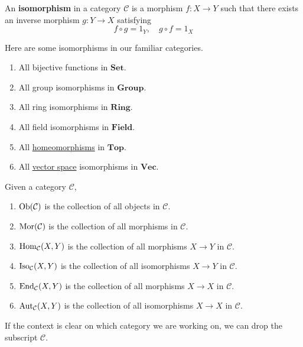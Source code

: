 	\begin{definition}[Isomorphism]
	  \label{def:isomorphism}
		An \textbf{isomorphism} in a category $\mathcal{C}$ is a morphism $f: X \to Y$ such that there exists an inverse morphism $g: Y \to X$ satisfying 
		\begin{equation}
		  f \circ g = 1_Y, \quad g \circ f = 1_X
		\end{equation}
	\end{definition}

	\begin{example}[Isomorphisms]
	  \label{ex:isomorphisms}
		Here are some isomorphisms in our familiar categories. 
	  \begin{enumerate}
			\item All bijective functions in $\mathbf{Set}$. 
			\item All group isomorphisms in $\mathbf{Group}$. 
			\item All ring isomorphisms in $\mathbf{Ring}$. 
			\item All field isomorphisms in $\mathbf{Field}$. 
			\item All \hyperref[pst-def:homeomorphism]{homeomorphisms} in $\mathbf{Top}$. 
			\item All \hyperref[lin-def:vector-space]{vector space} isomorphisms in $\mathbf{Vec}$. 
	  \end{enumerate}
	\end{example}

	\begin{definition}[Notation]
	  \label{def:notation}
		Given a category $\mathcal{C}$, 
		\begin{enumerate}
			\item $\operatorname{Ob}(\mathcal{C})$ is the collection of all objects in $\mathcal{C}$. 
			\item $\operatorname{Mor}(\mathcal{C})$ is the collection of all morphisms in $\mathcal{C}$. 
			\item $\operatorname{Hom}_{\mathcal{C}}(X, Y)$ is the collection of all morphisms $X \to Y$ in $\mathcal{C}$. 
			\item $\operatorname{Iso}_{\mathcal{C}}(X, Y)$ is the collection of all isomorphisms $X \to Y$ in $\mathcal{C}$. 
			\item $\operatorname{End}_{\mathcal{C}}(X, Y)$ is the collection of all morphisms $X \to X$ in $\mathcal{C}$. 
			\item $\operatorname{Aut}_{\mathcal{C}}(X, Y)$ is the collection of all isomorphisms $X \to X$ in $\mathcal{C}$. 
		\end{enumerate}
		If the context is clear on which category we are working on, we can drop the subscript $\mathcal{C}$. 
	\end{definition}

